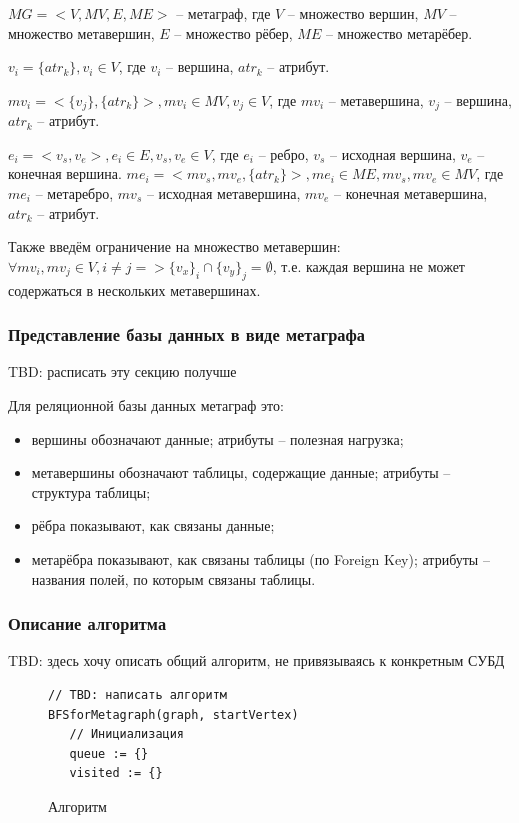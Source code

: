 $MG = <V, MV, E, ME>$ -- метаграф, где $V$ -- множество вершин, $MV$ -- множество метавершин, $E$ -- множество рёбер, $ME$ -- множество метарёбер.

$v_i = \{atr_k\}, v_i \in V$, где $v_i$ -- вершина, $atr_k$ -- атрибут.

$mv_i = <\{v_j\}, \{atr_k\}>, mv_i \in MV, v_j \in V$, где $mv_i$ -- метавершина, $v_j$ -- вершина, $atr_k$ -- атрибут.

$e_i = <v_s, v_e>, e_i \in E, v_s, v_e \in V$, где $e_i$ -- ребро, $v_s$ -- исходная вершина, $v_e$ -- конечная вершина.
$me_i = <mv_s, mv_e, \{atr_k\}>, me_i \in ME, mv_s, mv_e \in MV$, где $me_i$ -- метаребро, $mv_s$ -- исходная метавершина, $mv_e$ -- конечная метавершина, $atr_k$ -- атрибут.

Также введём ограничение на множество метавершин: $\forall mv_i, mv_j \in V, i \neq j => \{v_x\}_i \cap \{v_y\}_j = \emptyset$, т.е. каждая вершина не может содержаться в нескольких метавершинах.

\subsubsection{Представление базы данных в виде метаграфа}

TBD: расписать эту секцию получше

Для реляционной базы данных метаграф это:
\begin{itemize}
  \item вершины обозначают данные; атрибуты -- полезная нагрузка;
  \item метавершины обозначают таблицы, содержащие данные; атрибуты -- структура таблицы;
  \item рёбра показывают, как связаны данные;
  \item метарёбра показывают, как связаны таблицы (по Foreign Key); атрибуты -- названия полей, по которым связаны таблицы.
\end{itemize}

\subsubsection{Описание алгоритма}
TBD: здесь хочу описать общий алгоритм, не привязываясь к конкретным СУБД

\begin{figure}
  \fontsize{12pt}{14pt}\selectfont
  \begin{lstlisting}
// TBD: написать алгоритм
BFSforMetagraph(graph, startVertex)
   // Инициализация
   queue := {}
   visited := {}
  \end{lstlisting}
  \caption{Алгоритм }
\end{figure}

